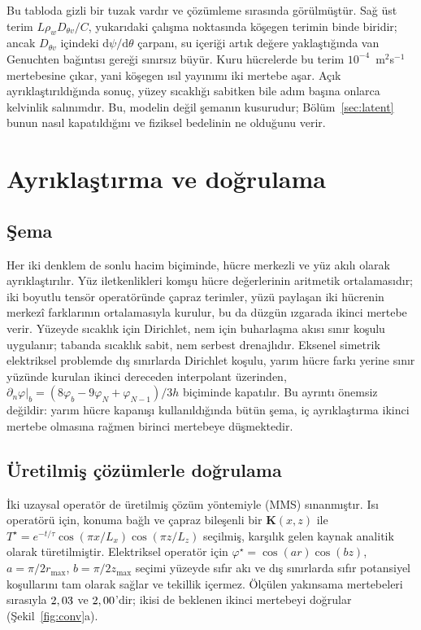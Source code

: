 \documentclass[11pt,a4paper]{article}
\newcommand{\dd}{\mathrm{d}}
\newcommand{\bK}{\mathbf{K}}
\begin{document}
Bu tabloda gizli bir tuzak vardır ve çözümleme sırasında görülmüştür. Sağ üst
terim $L\rho_w D_{\theta v}/C$, yukarıdaki çalışma noktasında köşegen terimin
binde biridir; ancak $D_{\theta v}$ içindeki $\dd\psi/\dd\theta$ çarpanı, su
içeriği artık değere yaklaştığında van Genuchten bağıntısı gereği sınırsız
büyür. Kuru hücrelerde bu terim $10^{-4}$~m$^2$s$^{-1}$ mertebesine çıkar,
yani köşegen ısıl yayınımı iki mertebe aşar. Açık ayrıklaştırıldığında sonuç,
yüzey sıcaklığı sabitken bile adım başına onlarca kelvinlik salınımdır. Bu,
modelin değil şemanın kusurudur; Bölüm~\ref{sec:latent} bunun nasıl
kapatıldığını ve fiziksel bedelinin ne olduğunu verir.

\section{Ayrıklaştırma ve doğrulama}
\label{sec:conv}

\subsection{Şema}

Her iki denklem de sonlu hacim biçiminde, hücre merkezli ve yüz akılı olarak
ayrıklaştırılır. Yüz iletkenlikleri komşu hücre değerlerinin aritmetik
ortalamasıdır; iki boyutlu tensör operatöründe çapraz terimler, yüzü paylaşan
iki hücrenin merkezî farklarının ortalamasıyla kurulur, bu da düzgün ızgarada
ikinci mertebe verir. Yüzeyde sıcaklık için Dirichlet, nem için buharlaşma
akısı sınır koşulu uygulanır; tabanda sıcaklık sabit, nem serbest drenajlıdır.
Eksenel simetrik elektriksel problemde dış sınırlarda Dirichlet koşulu,
yarım hücre farkı yerine sınır yüzünde kurulan ikinci dereceden interpolant
üzerinden, $\partial_n\varphi|_b = (8\varphi_b - 9\varphi_N + \varphi_{N-1})/3h$
biçiminde kapatılır. Bu ayrıntı önemsiz değildir: yarım hücre kapanışı
kullanıldığında bütün şema, iç ayrıklaştırma ikinci mertebe olmasına rağmen
birinci mertebeye düşmektedir.

\subsection{Üretilmiş çözümlerle doğrulama}

İki uzaysal operatör de üretilmiş çözüm yöntemiyle (MMS) sınanmıştır. Isı
operatörü için, konuma bağlı ve çapraz bileşenli bir $\bK(x,z)$ ile
$T^\star = e^{-t/\tau}\cos(\pi x/L_x)\cos(\pi z/L_z)$ seçilmiş, karşılık gelen
kaynak analitik olarak türetilmiştir. Elektriksel operatör için
$\varphi^\star = \cos(ar)\cos(bz)$, $a=\pi/2r_{\max}$, $b=\pi/2z_{\max}$
seçimi yüzeyde sıfır akı ve dış sınırlarda sıfır potansiyel koşullarını tam
olarak sağlar ve tekillik içermez. Ölçülen yakınsama mertebeleri sırasıyla
$2,03$ ve $2,00$'dir; ikisi de beklenen ikinci mertebeyi doğrular
(Şekil~\ref{fig:conv}a).
\end{document}
